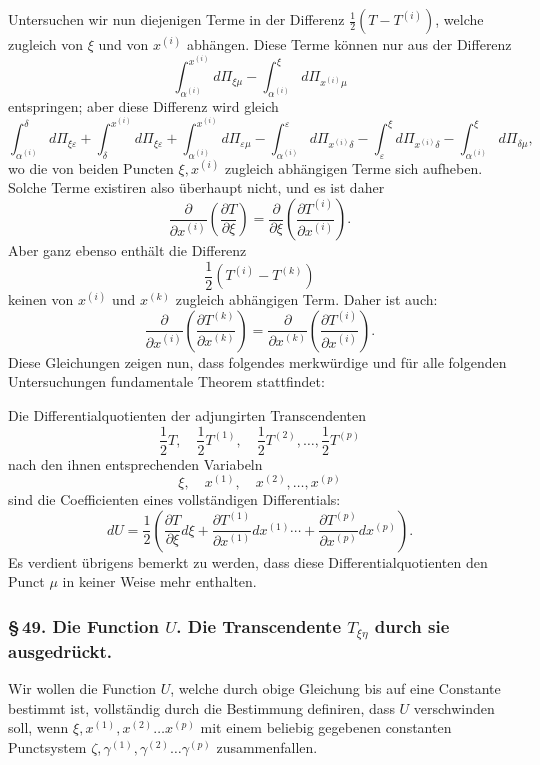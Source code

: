 \documentclass[10pt]{article}
\begin{document}
Untersuchen wir nun diejenigen Terme in der Differenz \(\frac12(T-T^{(i)})\), welche zugleich von \(\xi\) und von \(x^{(i)}\) abhängen. Diese Terme können nur aus der Differenz
\[
\int_{\alpha^{(i)}}^{x^{(i)}}d\Pi_{\xi\mu}-\int_{\alpha^{(i)}}^{\xi}d\Pi_{x^{(i)}\mu}
\]
entspringen; aber diese Differenz wird gleich
\begingroup\footnotesize
\[
\int_{\alpha^{(i)}}^{\delta}d\Pi_{\xi\varepsilon}
+\int_{\delta}^{x^{(i)}}d\Pi_{\xi\varepsilon}
+\int_{\alpha^{(i)}}^{x^{(i)}}d\Pi_{\varepsilon\mu}
-\int_{\alpha^{(i)}}^{\varepsilon}d\Pi_{x^{(i)}\delta}
-\int_{\varepsilon}^{\xi}d\Pi_{x^{(i)}\delta}
-\int_{\alpha^{(i)}}^{\xi}d\Pi_{\delta\mu},
\]
\endgroup
wo die von beiden Puncten \(\xi,x^{(i)}\) zugleich abhängigen Terme sich aufheben. Solche Terme existiren also überhaupt nicht, und es ist daher
\[
\frac{\partial}{\partial x^{(i)}}\left(\frac{\partial T}{\partial\xi}\right)
=\frac{\partial}{\partial\xi}\left(\frac{\partial T^{(i)}}{\partial x^{(i)}}\right).
\]
Aber ganz ebenso enthält die Differenz
\[
\frac12(T^{(i)}-T^{(k)})
\]
keinen von \(x^{(i)}\) und \(x^{(k)}\) zugleich abhängigen Term. Daher ist auch:
\[
\frac{\partial}{\partial x^{(i)}}\left(\frac{\partial T^{(k)}}{\partial x^{(k)}}\right)
=\frac{\partial}{\partial x^{(k)}}\left(\frac{\partial T^{(i)}}{\partial x^{(i)}}\right).
\]
Diese Gleichungen zeigen nun, dass folgendes merkwürdige und für alle folgenden Untersuchungen fundamentale Theorem stattfindet:

Die Differentialquotienten der adjungirten Transcendenten
\[
\frac12T,\quad \frac12T^{(1)},\quad \frac12T^{(2)},\ldots,\frac12T^{(p)}
\]
nach den ihnen entsprechenden Variabeln
\[
\xi,\quad x^{(1)},\quad x^{(2)},\ldots,x^{(p)}
\]
sind die Coefficienten eines vollständigen Differentials:
\[
dU=\frac12\left(\frac{\partial T}{\partial\xi}d\xi
+\frac{\partial T^{(1)}}{\partial x^{(1)}}dx^{(1)}\cdots
+\frac{\partial T^{(p)}}{\partial x^{(p)}}dx^{(p)}\right).
\]
Es verdient übrigens bemerkt zu werden, dass diese Differentialquotienten den Punct \(\mu\) in keiner Weise mehr enthalten.

\subsubsection*{\S\,49. Die Function \(U\). Die Transcendente \(T_{\xi\eta}\) durch sie ausgedrückt.}

Wir wollen die Function \(U\), welche durch obige Gleichung bis auf eine Constante bestimmt ist, vollständig durch die Bestimmung definiren, dass \(U\) verschwinden soll, wenn \(\xi,x^{(1)},x^{(2)}\ldots x^{(p)}\) mit einem beliebig gegebenen constanten Punctsystem \(\zeta,\gamma^{(1)},\gamma^{(2)}\ldots\gamma^{(p)}\) zusammenfallen.
\end{document}
